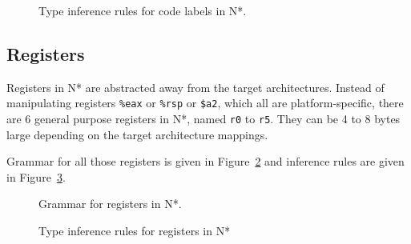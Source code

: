 \begin{figure}[H]
  \centering

  \begin{prooftree}
  \end{prooftree}

  \caption{Type inference rules for code labels in N*.}
  \label{fig:nstar-common-expressions-labels-code-typerules}
\end{figure}

\subsection{Registers}\label{subsec:nstar-common-expressions-registers}

Registers in N* are abstracted away from the target architectures.
Instead of manipulating registers \texttt{\%eax} or \texttt{\%rsp} or \texttt{\$a2}, which all are platform-specific, there are 6 general purpose registers in N*, named \texttt{r0} to \texttt{r5}.
They can be 4 to 8 bytes large depending on the target architecture mappings.

Grammar for all those registers is given in Figure~\ref{fig:nstar-common-expressions-registers-grammar} and inference rules are given in Figure~\ref{fig:nstar-common-expressions-registers-typerules}.

\begin{figure}[htb]
  \centering


  \caption{Grammar for registers in N*.}
  \label{fig:nstar-common-expressions-registers-grammar}
\end{figure}

\begin{figure}[htb]
  \centering

  \begin{prooftree}
  \end{prooftree}

  \caption{Type inference rules for registers in N*}
  \label{fig:nstar-common-expressions-registers-typerules}
\end{figure}

